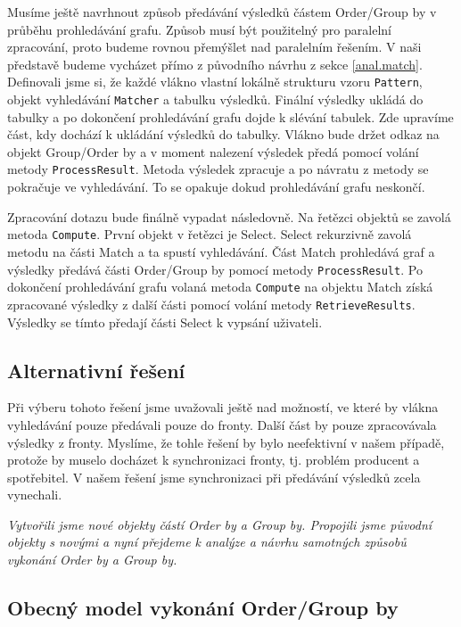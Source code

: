 Musíme ještě navrhnout způsob předávání výsledků částem Order/Group by v průběhu prohledávání grafu.
Způsob musí být použitelný pro paralelní zpracování, proto budeme rovnou přemýšlet nad paralelním řešením.
V naši představě budeme vycházet přímo z původního návrhu z sekce \ref{anal.match}.
Definovali jsme si, že každé vlákno vlastní lokálně strukturu vzoru \texttt{Pattern}, objekt vyhledávání \texttt{Matcher} a tabulku výsledků.
Finální výsledky ukládá do tabulky a po dokončení prohledávání grafu dojde k slévání tabulek.
Zde upravíme část, kdy dochází k ukládání výsledků do tabulky.
Vlákno bude držet odkaz na objekt Group/Order by a v moment nalezení výsledek předá pomocí volání metody \texttt{ProcessResult}.
Metoda výsledek zpracuje a po návratu z metody se pokračuje ve vyhledávání.
To se opakuje dokud prohledávání grafu neskončí.

Zpracování dotazu bude finálně vypadat následovně.
Na řetězci objektů se zavolá metoda \texttt{Compute}.
První objekt v řetězci je Select.
Select rekurzivně zavolá metodu na části Match a ta spustí vyhledávání.
Část Match prohledává graf a výsledky předává části Order/Group by pomocí metody \texttt{ProcessResult}.
Po dokončení prohledávání grafu volaná metoda \texttt{Compute} na objektu Match získá zpracované výsledky z další části pomocí volání metody \texttt{RetrieveResults}.
Výsledky se tímto předají části Select k vypsání uživateli. 

\subsection{Alternativní řešení}

Při výberu tohoto řešení jsme uvažovali ještě nad možností, ve které by vlákna vyhledávání pouze předávali pouze do fronty.
Další část by pouze zpracovávala výsledky z fronty.
Myslíme, že tohle řešení by bylo neefektivní v našem případě, protože by muselo docházet k synchronizaci fronty, tj. problém producent a spotřebitel.
V našem řešení jsme synchronizaci při předávání výsledků zcela vynechali.

\bigskip
\textit{
Vytvořili jsme nové objekty částí Order by a Group by.
Propojili jsme původní objekty s novými a nyní přejdeme k analýze a návrhu samotných způsobů vykonání Order by a Group by.}

\subsection{Obecný model vykonání Order/Group by}

